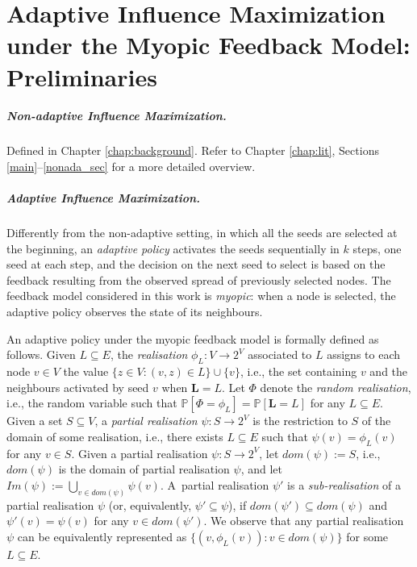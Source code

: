\section{Adaptive Influence Maximization under the Myopic Feedback Model: Preliminaries}\label{prel_myo}


\subparagraph*{Non-adaptive Influence Maximization.} Defined in Chapter \ref{chap:background}. Refer to Chapter \ref{chap:lit}, Sections \ref{main}--\ref{nonada_sec} for a more detailed overview. 


\subparagraph*{Adaptive Influence Maximization.} Differently from the non-adaptive setting, in which all the seeds are selected at the beginning, an {\em adaptive policy} activates the seeds sequentially in $k$ steps,
one seed at each step, and the decision on the next seed to select is based on the feedback resulting from the observed spread of previously selected nodes. The feedback model considered in this work is {\em myopic}: when a node is selected, the adaptive policy observes the state of its neighbours. 

An adaptive policy under the myopic feedback model is formally defined as follows. Given $L\subseteq E$, the {\em realisation} $\phi_L:V\rightarrow 2^V$ associated to $L$ assigns to each node $v\in V$ the value $\{z\in V:(v,z)\in L\}\cup\{v\}$, i.e., the set containing $v$ and the neighbours activated by seed $v$ when $\bm L=L$. Let $\Phi$ denote the {\em random realisation}, i.e., the random variable such that $\mathbb{P}[\Phi=\phi_L]=\mathbb{P}[\bm L=L]$ for any $L\subseteq E$. Given a set $S\subseteq V$, a {\em partial realisation} $\psi:S\rightarrow 2^V$ is the restriction to $S$ of the domain of some realisation, i.e., there exists $L\subseteq E$ such that $\psi(v)=\phi_L(v)$ for any $v\in S$. Given a partial realisation $\psi:S\rightarrow 2^V$, let $dom(\psi):=S$, i.e., $dom(\psi)$ is the domain of partial realisation $\psi$, and let $Im(\psi):=\bigcup_{v\in dom(\psi)}\psi(v)$. A~partial realisation $\psi'$ is a {\em sub-realisation} of a partial realisation $\psi$ (or, equivalently,  $\psi'\subseteq \psi$), if $dom(\psi')\subseteq dom(\psi)$ and $\psi'(v)=\psi(v)$ for any $v\in dom(\psi')$. We observe that any partial realisation $\psi$ can be equivalently represented as $\{(v,\phi_L(v)):v\in dom(\psi)\}$ for some $L\subseteq E$. 


